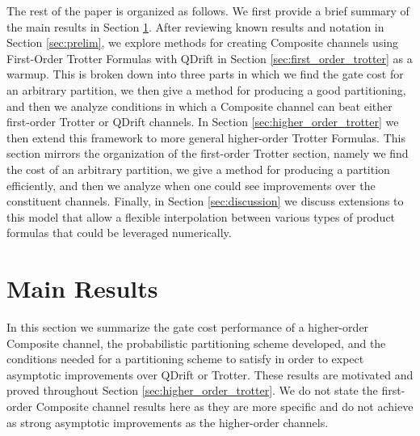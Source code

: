 The rest of the paper is organized as follows. We first provide a brief summary of the main results in Section \ref{sec:main}. After reviewing known results and notation in Section \ref{sec:prelim}, we explore methods for creating Composite channels using First-Order Trotter Formulas with QDrift in Section \ref{sec:first_order_trotter} as a warmup. This is broken down
into three parts in which we find the gate cost for an arbitrary partition, we then give a method for producing a good partitioning, and then we analyze conditions in which a Composite channel can beat either first-order Trotter or QDrift channels. In Section \ref{sec:higher_order_trotter} we then extend this framework to more general higher-order Trotter Formulas. This section mirrors the organization of the first-order Trotter section,
namely we find the cost of an arbitrary partition, we give a method for producing a partition efficiently, and then we analyze when one could see
improvements over the constituent channels. Finally, in Section \ref{sec:discussion} we discuss extensions to this model that allow a flexible interpolation between various types of product formulas that could be leveraged numerically. 

\section{Main Results} \label{sec:main}
In this section we summarize the gate cost performance of a higher-order Composite channel, the probabilistic partitioning scheme developed, and the conditions needed for a partitioning scheme to satisfy in order to expect asymptotic improvements over QDrift or Trotter. These results are motivated and proved throughout Section \ref{sec:higher_order_trotter}. We do not state the first-order Composite channel results here as they are more specific and do not achieve as strong asymptotic improvements as the higher-order channels.

